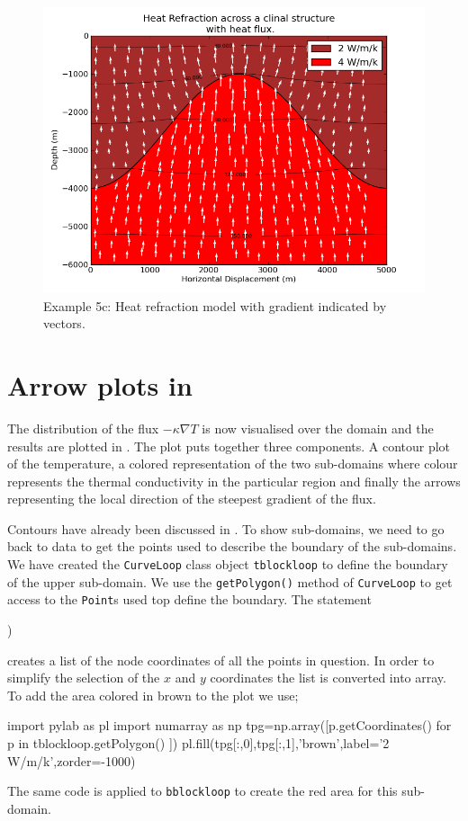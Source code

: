 \begin{figure}[ht]
\centerline{\includegraphics[width=5.in]{figures/heatrefractionflux}}
\caption{Example 5c: Heat refraction model with gradient indicated by vectors.}
\label{fig:hr001qumodel}
\end{figure}

\section{Arrow plots in \mpl}
The distribution of the flux $-\kappa \nabla T$ is now visualised over the
domain 
and the results are plotted in . 
The plot puts together three components. A contour plot of the temperature,
a colored representation of the two sub-domains where colour represents the
thermal conductivity 
in the particular region and finally the arrows representing the local direction
of the steepest gradient of the flux.

Contours have already been discussed in . To show
sub-domains, 
we need to go back to \pycad data to get the points used to describe the
boundary of the 
sub-domains. We have created the \verb|CurveLoop| class object 
\verb|tblockloop| to define the boundary of the upper sub-domain. 
We use the \verb|getPolygon()| method of \verb|CurveLoop| to get
access to the \verb|Point|s used top define the boundary. The statement
\begin{python}
)
\end{python}
creates a list of the node coordinates of all the points in question. In order 
to simplify the selection of the $x$ and $y$ coordinates the list is converted 
into \modnumpy array. To add the area colored in brown to the plot we use; 
\begin{python}
import pylab as pl
import numarray as np
tpg=np.array([p.getCoordinates() for p in tblockloop.getPolygon() ])
pl.fill(tpg[:,0],tpg[:,1],'brown',label='2 W/m/k',zorder=-1000)
\end{python}
The same code is applied to \verb|bblockloop| to create the red area for this
sub-domain.

